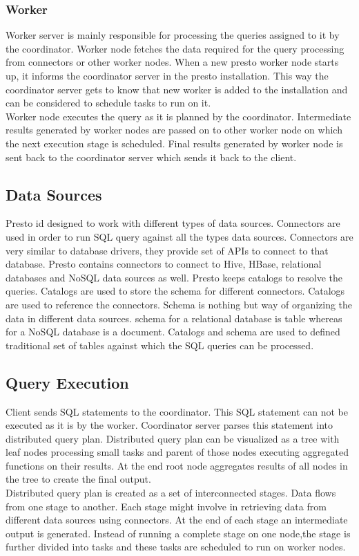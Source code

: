 \subsubsection{Worker}
Worker server is mainly responsible for processing the queries assigned to it by the coordinator. Worker node fetches the data required for the query processing from connectors or other worker nodes. When a new presto worker node starts up, it informs the coordinator server in the presto installation. This way the coordinator server gets to know that new worker is added to the installation and can be considered to schedule tasks to run on it.\\
Worker node executes the query as it is planned by the coordinator. Intermediate results generated by worker nodes are passed on to other worker node on which the next execution stage is scheduled. Final results generated by worker node is sent back to the coordinator server which sends it back to the client.

\subsection{Data Sources}
Presto id designed to work with different types of data sources. Connectors are used in order to run SQL query against all the types data sources. Connectors are very similar to database drivers, they provide set of APIs to connect to that database. Presto contains connectors to connect to Hive, HBase, relational databases and NoSQL data sources as well. Presto keeps catalogs to resolve the queries. Catalogs are used to store the schema for different connectors. Catalogs are used to reference the connectors. Schema is nothing but way of organizing the data in different data sources. schema for a relational database is table whereas for a NoSQL database is a document. Catalogs and schema are used to defined traditional set of tables against which the SQL queries can be processed.

\subsection{Query Execution}
Client sends SQL statements to the coordinator. This SQL statement can not be executed as it is by the worker. Coordinator server parses this statement into distributed query plan. Distributed query plan can be visualized as a tree with leaf nodes processing small tasks and parent of those nodes executing aggregated functions on their results. At the end root node aggregates results of all nodes in the tree to create the final output.\\
Distributed query plan is created as a set of interconnected stages. Data flows from one stage to another. Each stage might involve in retrieving data from different data sources using connectors. At the end of each stage an intermediate output is generated. Instead of running a complete stage on one node,the stage is further divided into tasks and these tasks are scheduled to run on worker nodes. 

